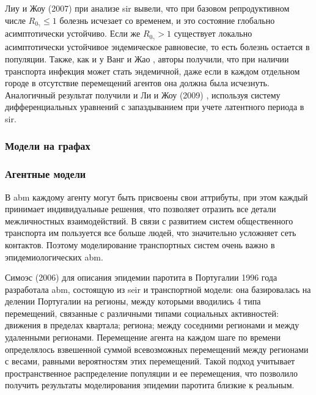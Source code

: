 \documentclass[a4paper,12pt]{article} %
\begin{document}
Лиу и Жоу (2007) \cite{liu2009global} при анализе \gls{sir} вывели, что при базовом репродуктивном числе $R_{0_\gamma} \leqslant 1$ болезнь исчезает со временем, и это состояние глобально асимптотически устойчиво. Если же $R_{0_\gamma} > 1$ существует локально асимптотически устойчивое эндемическое равновесие, то есть болезнь остается в популяции. Также, как и у Ванг и Жао \cite{wang2004epidemic}, авторы получили, что при наличии транспорта инфекция может стать эндемичной, даже если в каждом отдельном городе в отсутствие перемещений агентов она должна была исчезнуть. Аналогичный результат получили и Ли и Жоу (2009) \cite{li2010dynamics}, используя систему дифференциальных уравнений с запаздыванием при учете латентного периода в \gls{sir}.

\subsubsection{Модели на графах}
\subsubsection{Агентные модели}
В \gls{abm} каждому агенту могут быть присвоены свои аттрибуты, при этом каждый принимает индивидуальные решения, что позволяет отразить все детали межличностных взаимодействий. В связи с развитием систем общественного транспорта им пользуется все больше людей, что значительно усложняет сеть контактов. Поэтому моделирование транспортных систем очень важно в эпидемиологических \gls{abm}.

Симоэс (2006) \cite{simoes2006modelling} для описания эпидемии паротита в Португалии 1996 года разработала \gls{abm}, состоящую из \gls{seir} и транспортной модели: она базировалась на делении Португалии на регионы, между которыми вводились 4 типа перемещений, связанные с различными типами социальных активностей: движения в пределах квартала; региона; между соседними регионами и между удаленными регионами. Перемещение агента на каждом шаге по времени определялось взвешенной суммой всевозможных перемещений между регионами с весами, равными вероятностям этих перемещений. Такой подход учитывает пространственное распределение популяции и ее перемещения, что позволило получить результаты моделирования эпидемии паротита близкие к реальным.
\end{document}
